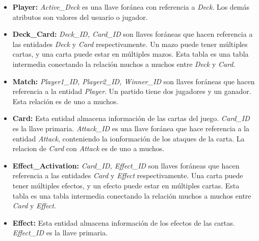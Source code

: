 \documentclass{article}
\begin{document}
\begin{itemize}
  \item \textbf{Player:} \textit{Active\_Deck} es una llave foránea con referencia a \textit{Deck}. Los demás atributos son valores del usuario o jugador. 
  \item \textbf{Deck\_Card:} \textit{Deck\_ID, Card\_ID} son llaves foráneas que hacen referencia a las entidades \textit{Deck} y \textit{Card} respectivamente. Un mazo puede tener múltiples cartas, y una carta puede estar en múltiples mazos. Esta tabla es una tabla intermedia conectando la relación muchos a muchos entre \textit{Deck} y \textit{Card}. 
  \item \textbf{Match:} \textit{Player1\_ID, Player2\_ID, Winner\_ID} son llaves foráneas que hacen referencia a la entidad \textit{Player}. Un partido tiene dos jugadores y un ganador. Esta relaci\'on es de uno a muchos. 
  \item \textbf{Card:} Esta entidad almacena informaci\'on de las cartas del juego. \textit{Card\_ID} es la llave primaria. \textit{Attack\_ID} es una llave foránea que hace referencia a la entidad \textit{Attack}, conteniendo la ionformaci\'on de los ataques de la carta. La relacion de \textit{Card} con \textit{Attack} es de uno a muchos. 
  \item \textbf{Effect\_Activation:} \textit{Card\_ID, Effect\_ID} son llaves foráneas que hacen referencia a las entidades \textit{Card} y \textit{Effect} respectivamente. Una carta puede tener múltiples efectos, y un efecto puede estar en múltiples cartas. Esta tabla es una tabla intermedia conectando la relación muchos a muchos entre \textit{Card} y \textit{Effect}. 
  \item \textbf{Effect:} Esta entidad almacena informaci\'on de los efectos de las cartas. \textit{Effect\_ID} es la llave primaria.

\end{itemize}
\end{document}
